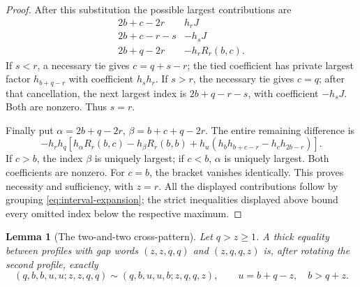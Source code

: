 \documentclass[11pt,a4paper]{amsart}
\numberwithin{equation}{section}
\theoremstyle{plain}
\newtheorem{lemma}[theorem]{Lemma}
\theoremstyle{definition}
\begin{document}
\begin{proof}
After this substitution the possible largest contributions are
\[
\begin{array}{c|c}
 2b+c-2r&h_rJ\\
 2b+c-r-s&-h_sJ\\
 2b+q-2r&-h_rR_r(b,c).
\end{array}
\]
If \(s<r\), a necessary tie gives \(c=q+s-r\); the tied coefficient
has private largest factor \(h_{b+q-r}\) with coefficient \(h_sh_r\).
If \(s>r\), the necessary tie gives \(c=q\); after that cancellation,
the next largest index is \(2b+q-r-s\), with coefficient \(-h_sJ\).
Both are nonzero.  Thus \(s=r\).

Finally put \(\alpha=2b+q-2r\), \(\beta=b+c+q-2r\).  The entire
remaining difference is
\[
 -h_rh_q\left[
 h_\alpha R_r(b,c)-h_\beta R_r(b,b)
 +h_u(h_bh_{b+c-r}-h_ch_{2b-r})\right].
\]
If \(c>b\), the index \(\beta\) is uniquely largest; if \(c<b\),
\(\alpha\) is uniquely largest.  Both coefficients are nonzero.
For \(c=b\), the bracket vanishes identically.  This proves necessity
and sufficiency, with \(z=r\).
All the displayed contributions follow by grouping
\eqref{eq:interval-expansion}; the strict inequalities displayed above
bound every omitted index below the respective maximum.
\end{proof}

\begin{lemma}[The two-and-two cross-pattern]
\label{lem:staircase-a2}
Let \(q>z\ge1\).  A thick equality between profiles with gap words
\((z,z,q,q)\) and \((z,q,q,z)\) is, after rotating the second profile,
exactly
\[
 (q,b,b,u,u;z,z,q,q)
 \sim(q,b,u,u,b;z,q,q,z),
 \qquad u=b+q-z,\quad b>q+z.
\]
\end{lemma}
\end{document}
